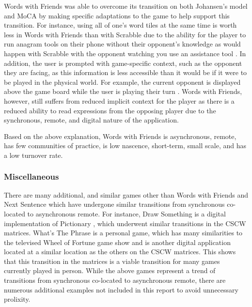 \documentclass{sigchi}
\begin{document}
Words with Friends was able to overcome its transition on both Johansen's model and MoCA by making specific adaptations to the game to help support this transition. For instance, using all of one's word tiles at the same time is worth less in Words with Friends than with Scrabble due to the ability for the player to run anagram tools on their phone without their opponent's knowledge as would happen with Scrabble with the opponent watching you use an assistance tool \cite{wwf-vs-scrabble}. In addition, the user is prompted with game-specific context, such as the opponent they are facing, as this information is less accessible than it would be if it were to be played in the physical world. For example, the current opponent is displayed above the game board while the user is playing their turn \cite{words-with-friends-opponent}. Words with Friends, however, still suffers from reduced implicit context for the player as there is a reduced ability to read expressions from the opposing player due to the synchronous, remote, and digital nature of the application.

Based on the above explanation, Words with Friends is asynchronous, remote, has few communities of practice, is low nascence, short-term, small scale, and has a low turnover rate.
\newline


\subsubsection{Miscellaneous}
There are many additional, and similar games other than Words with Friends and Next Sentence which have undergone similar transitions from synchronous co-located to asynchronous remote. For instance, Draw Something is a digital implementation of Pictionary \cite{draw-something, draw-something-background}, which underwent similar transitions in the CSCW matrices. What's The Phrase is a personal game, which has many similarities to the televised Wheel of Fortune game show \cite{whats-the-phrase} and is another digital application located at a similar location as the others on the CSCW matrices. This shows that this transition in the matrices is a viable transition for many games currently played in person. While the above games represent a trend of transitions from synchronous co-located to asynchronous remote, there are numerous additional examples not included in this report to avoid unnecessary prolixity.
\end{document}
